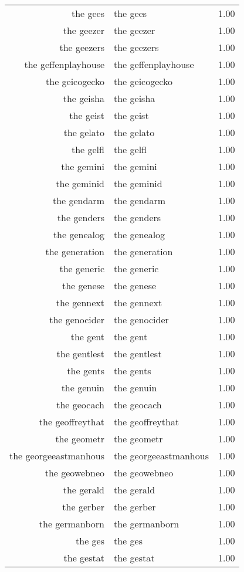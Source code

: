 \begin{table}[ht]
\begin{tabular}{rlr}
  the gees & the gees & 1.00 \\ 
  the geezer & the geezer & 1.00 \\ 
  the geezers & the geezers & 1.00 \\ 
  the geffenplayhouse & the geffenplayhouse & 1.00 \\ 
  the geicogecko & the geicogecko & 1.00 \\ 
  the geisha & the geisha & 1.00 \\ 
  the geist & the geist & 1.00 \\ 
  the gelato & the gelato & 1.00 \\ 
  the gelfl & the gelfl & 1.00 \\ 
  the gemini & the gemini & 1.00 \\ 
  the geminid & the geminid & 1.00 \\ 
  the gendarm & the gendarm & 1.00 \\ 
  the genders & the genders & 1.00 \\ 
  the genealog & the genealog & 1.00 \\ 
  the generation & the generation & 1.00 \\ 
  the generic & the generic & 1.00 \\ 
  the genese & the genese & 1.00 \\ 
  the gennext & the gennext & 1.00 \\ 
  the genocider & the genocider & 1.00 \\ 
  the gent & the gent & 1.00 \\ 
  the gentlest & the gentlest & 1.00 \\ 
  the gents & the gents & 1.00 \\ 
  the genuin & the genuin & 1.00 \\ 
  the geocach & the geocach & 1.00 \\ 
  the geoffreythat & the geoffreythat & 1.00 \\ 
  the geometr & the geometr & 1.00 \\ 
  the georgeeastmanhous & the georgeeastmanhous & 1.00 \\ 
  the geowebneo & the geowebneo & 1.00 \\ 
  the gerald & the gerald & 1.00 \\ 
  the gerber & the gerber & 1.00 \\ 
  the germanborn & the germanborn & 1.00 \\ 
  the ges & the ges & 1.00 \\ 
  the gestat & the gestat & 1.00 \\ 

\end{tabular}
\end{table}
